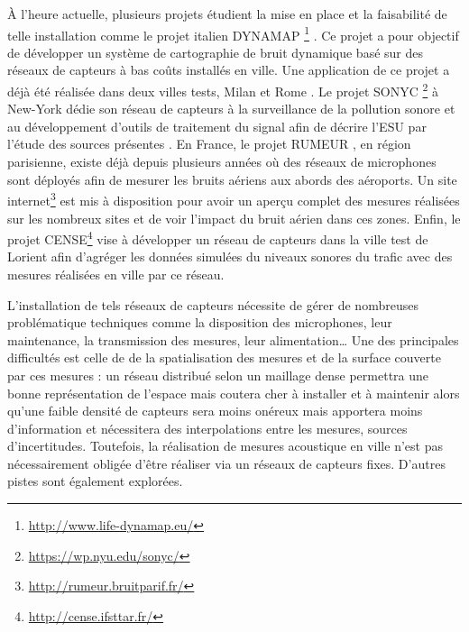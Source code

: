 \`A l'heure actuelle, plusieurs projets étudient la mise en place et la faisabilité de telle installation comme le projet italien DYNAMAP \footnote{\url{http://www.life-dynamap.eu/}} \cite{dynamap_2016}. Ce projet a pour objectif de développer un système de cartographie de bruit dynamique basé sur des réseaux de capteurs à bas coûts installés en ville. Une application de ce projet a déjà été réalisée dans deux villes tests, Milan et Rome \cite{bellucci_life_2017}. 
Le projet SONYC \footnote{\url{https://wp.nyu.edu/sonyc/}} à New-York dédie son réseau de capteurs à la surveillance de la pollution sonore et au développement d'outils de traitement du signal afin de décrire l'ESU par l'étude des sources présentes \cite{mydlarz2017noise}. En France, le projet RUMEUR \cite{mietlicki2012innovative}, en région parisienne, existe déjà depuis plusieurs années où des réseaux de microphones sont déployés afin de mesurer les bruits aériens aux abords des aéroports. Un site internet\footnote{\url{http://rumeur.bruitparif.fr/}} est mis à disposition pour avoir un aperçu complet des mesures réalisées sur les nombreux sites et de voir l'impact du bruit aérien dans ces zones. Enfin, le projet CENSE\footnote{\url{http://cense.ifsttar.fr/}} vise à développer un réseau de capteurs dans la ville test de Lorient afin d'agréger les données simulées du niveaux sonores du trafic avec des mesures réalisées en ville par ce réseau.  

L'installation de tels réseaux de capteurs nécessite de gérer de nombreuses problématique techniques comme la disposition des microphones, leur maintenance, la transmission des mesures, leur alimentation\dots{} Une des principales difficultés est celle de de la spatialisation des mesures et de la surface couverte par ces mesures : un réseau distribué selon un maillage dense permettra une bonne représentation de l'espace mais coutera cher à installer et à maintenir alors qu'une faible densité de capteurs sera moins onéreux mais apportera moins d'information et nécessitera des interpolations entre les mesures, sources d'incertitudes.
Toutefois, la réalisation de mesures acoustique en ville n'est pas nécessairement obligée d'être réaliser via un réseaux de capteurs fixes. D'autres pistes sont également explorées.

